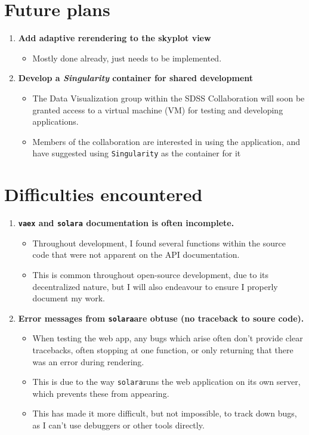 \documentclass[a4paper,10pt,twocolumn]{article}
\newcommand{\solara}{\texttt{solara}}
\begin{document}
\section{Future plans}
\begin{enumerate}
	\item \textbf{Add adaptive rerendering to the skyplot view}
	      \begin{itemize}
		      \item Mostly done already, just needs to be implemented.
	      \end{itemize}
	      \item\textbf{Develop a \emph{Singularity} container for shared development}
	      \begin{itemize}
		      \item The Data Visualization group within the SDSS Collaboration will soon be granted access to a virtual machine (VM) for testing and developing applications.
		      \item Members of the collaboration are interested in using the application, and have suggested using \texttt{Singularity} as the container for it
	      \end{itemize}
\end{enumerate}



\section{Difficulties encountered}
\begin{enumerate}
	\item \textbf{\texttt{vaex} and \texttt{solara} documentation is often incomplete.}
	      \begin{itemize}
		      \item Throughout development, I found several functions within the source code that were not apparent on the API documentation.
		      \item This is common throughout open-source development, due to its decentralized nature, but I will also endeavour to ensure I properly document my work.
	      \end{itemize}
	\item \textbf{Error messages from \solara are obtuse (no traceback to soure code).}
	      \begin{itemize}
		      \item When testing the web app, any bugs which arise often don't provide clear tracebacks, often stopping at one function, or only returning that there was an error during rendering.
		      \item This is due to the way \solara runs the web application on its own server, which prevents these from appearing.
		      \item This has made it more difficult, but not impossible, to track down bugs, as I can't use debuggers or other tools directly.
	      \end{itemize}
\end{enumerate}
\end{document}
